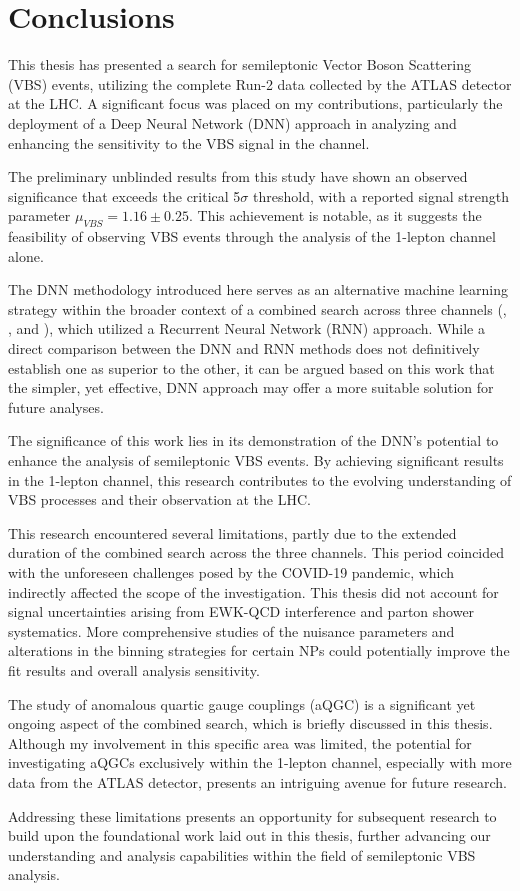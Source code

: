 \clearpage
\section{Conclusions}

This thesis has presented a search for semileptonic Vector Boson Scattering (VBS) events, utilizing the complete Run-2 data collected by the ATLAS detector at the LHC. A significant focus was placed on my contributions, particularly the deployment of a Deep Neural Network (DNN) approach in analyzing and enhancing the sensitivity to the VBS signal in the \olep channel.


The preliminary unblinded results from this study have shown an observed significance that exceeds the critical 5$\sigma$ threshold, with a reported signal strength parameter $\mu_{VBS} = 1.16 \pm 0.25$.
This achievement is notable, as it suggests the feasibility of observing VBS events through the analysis of the 1-lepton channel alone.


The DNN methodology introduced here serves as an alternative machine learning strategy within the broader context of a combined search across three channels (\zlep, \olep, and \tlep), which utilized a Recurrent Neural Network (RNN) approach. While a direct comparison between the DNN and RNN methods does not definitively establish one as superior to the other, it can be argued based on this work that the simpler, yet effective, DNN approach may offer a more suitable solution for future analyses.

The significance of this work lies in its demonstration of the DNN's potential to enhance the analysis of semileptonic VBS events. By achieving significant results in the 1-lepton channel, this research contributes to the evolving understanding of VBS processes and their observation at the LHC.

This research encountered several limitations, partly due to the extended duration of the combined search across the three channels. This period coincided with the unforeseen challenges posed by the COVID-19 pandemic, which indirectly affected the scope of the investigation. 
This thesis did not account for signal uncertainties arising from EWK-QCD interference and parton shower systematics. More comprehensive studies of the nuisance parameters and alterations in the binning strategies for certain NPs could potentially improve the fit results and overall analysis sensitivity.

The study of anomalous quartic gauge couplings (aQGC) is a significant yet ongoing aspect of the combined search, which is briefly discussed in this thesis. Although my involvement in this specific area was limited, the potential for investigating aQGCs exclusively within the 1-lepton channel, especially with more data from the ATLAS detector, presents an intriguing avenue for future research.

Addressing these limitations presents an opportunity for subsequent research to build upon the foundational work laid out in this thesis, further advancing our understanding and analysis capabilities within the field of semileptonic VBS analysis.




